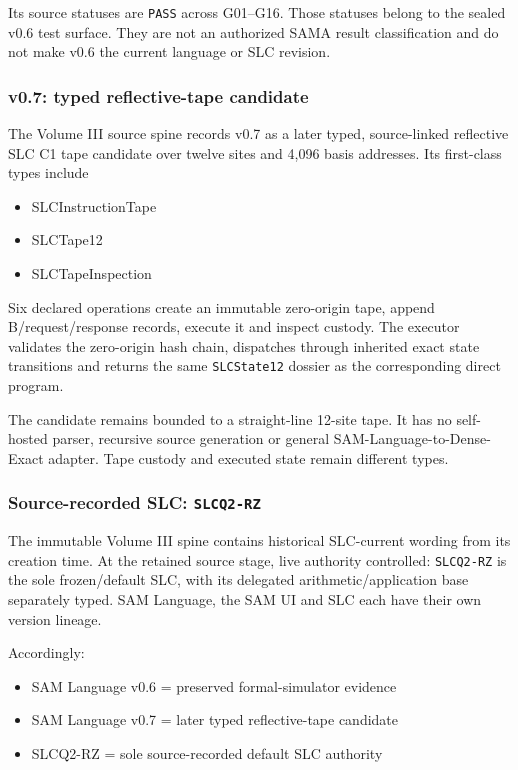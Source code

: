 Its source statuses are \texttt{PASS} across G01--G16. Those statuses
belong to the sealed v0.6 test surface. They are not an authorized SAMA
result classification and do not make v0.6 the current language or SLC
revision.

\subsubsection{v0.7: typed reflective-tape
candidate}\label{viii-ch02-v0.7-typed-reflective-tape-candidate}

The Volume III source spine records v0.7 as a later typed, source-linked
reflective SLC C1 tape candidate over twelve sites and 4,096 basis
addresses. Its first-class types include

\begin{itemize}
\tightlist
\item
  SLCInstructionTape
\item
  SLCTape12
\item
  SLCTapeInspection
\end{itemize}

Six declared operations create an immutable zero-origin tape, append
B/request/response records, execute it and inspect custody. The executor
validates the zero-origin hash chain, dispatches through inherited exact
state transitions and returns the same \texttt{SLCState12} dossier as
the corresponding direct program.

The candidate remains bounded to a straight-line 12-site tape. It has no
self-hosted parser, recursive source generation or general
SAM-Language-to-Dense-Exact adapter. Tape custody and executed state
remain different types.

\subsubsection{\texorpdfstring{Source-recorded SLC:
\texttt{SLCQ2-RZ}}{Source-recorded SLC: SLCQ2-RZ}}\label{viii-ch02-source-recorded-slc-slcq2-rz}

The immutable Volume III spine contains historical SLC-current wording
from its creation time. At the retained source stage, live authority controlled:
\texttt{SLCQ2-RZ} is the sole frozen/default SLC, with its delegated
arithmetic/application base separately typed. SAM Language, the SAM UI
and SLC each have their own version lineage.

Accordingly:

\begin{itemize}
\tightlist
\item
  SAM Language v0.6 = preserved formal-simulator evidence
\item
  SAM Language v0.7 = later typed reflective-tape candidate
\item
  SLCQ2-RZ = sole source-recorded default SLC authority
\end{itemize}

